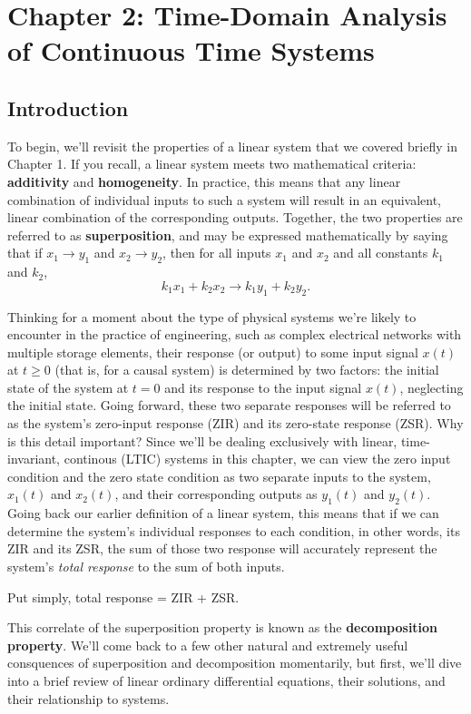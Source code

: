 \documentclass{article}
\begin{document}
\setcounter{section}{1}
\section{Chapter 2: Time-Domain Analysis of Continuous Time Systems} 
\setcounter{subsection}{0}
\subsection{Introduction}

To begin, we'll revisit the properties of a linear system that we covered briefly in Chapter 1. If you recall, a linear system meets two mathematical criteria: \textbf{additivity} and \textbf{homogeneity}. In practice, this means that any linear combination of individual inputs to such a system will result in an equivalent, linear combination of the corresponding outputs. Together, the two properties are referred to as \textbf{superposition}, and may be expressed mathematically by saying that if \(x_1 \to y_1\) and \(x_2 \to y_2\), then for all inputs \(x_1\) and \(x_2\) and all constants \(k_1\) and \(k_2\), 
\[
  k_1x_1 + k_2x_2 \to k_1y_1 + k_2y_2.
\]

Thinking for a moment about the type of physical systems we're likely to encounter in the practice of engineering, such as complex electrical networks with multiple storage elements, their response (or output) to some input signal \(x(t)\) at \(t \geq 0\) (that is, for a causal system) is determined by two factors: the initial state of the system at \(t=0\) and its response to the input signal \(x(t)\), neglecting the initial state. Going forward, these two separate responses will be referred to as the system's zero-input response (ZIR) and its zero-state response (ZSR). Why is this detail important? Since we'll be dealing exclusively with linear, time-invariant, continous (LTIC) systems in this chapter, we can view the zero input condition and the zero state condition as two separate inputs to the system, \(x_1(t)\) and \(x_2(t)\), and their corresponding outputs as \(y_1(t)\) and \(y_2(t)\). Going back our earlier definition of a linear system, this means that if we can determine the system's individual responses to each condition, in other words, its ZIR and its ZSR, the sum of those two response will accurately represent the system's \textit{total response} to the sum of both inputs. 

Put simply, total response = ZIR + ZSR.

This correlate of the superposition property is known as the \textbf{decomposition property}. We'll come back to a few other natural and extremely useful consquences of superposition and decomposition momentarily, but first, we'll dive into a brief review of linear ordinary differential equations, their solutions, and their relationship to systems. 
\end{document}
